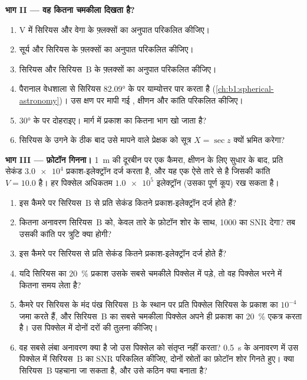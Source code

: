 \begin{problem}
\medskip
\noindent\textbf{भाग II --- वह कितना चमकीला दिखता है?}
\begin{enumerate}[resume]
  \item V में सिरियस और वेगा के फ़्लक्सों का अनुपात परिकलित कीजिए।
  \item सूर्य और सिरियस के फ़्लक्सों का अनुपात परिकलित कीजिए।
  \item सिरियस और सिरियस~B के फ़्लक्सों का अनुपात परिकलित कीजिए।
  \item पैरानाल वेधशाला से सिरियस \ang{82.09} के  पर याम्योत्तर पार करता है (\cref{ch:b1:spherical-astronomy})। उस क्षण पर मापी गई , क्षीणन और कांति परिकलित कीजिए।
  \item \ang{30} के  पर दोहराइए। मार्ग में प्रकाश का कितना भाग खो जाता है?
  \item सिरियस के उगने के ठीक बाद उसे मापने वाले प्रेक्षक को सूत्र $X = \sec z$ क्यों भ्रमित करेगा?
\end{enumerate}

\medskip
\noindent\textbf{भाग III --- फ़ोटॉन गिनना।}
\qty{1}{m} की दूरबीन पर एक कैमरा, क्षीणन के लिए सुधार के बाद, प्रति सेकंड $\num{3.0e4}$ प्रकाश-इलेक्ट्रॉन
दर्ज करता है, और यह एक ऐसे तारे से है जिसकी कांति $V = 10.0$ है। हर पिक्सेल अधिकतम
$\num{1.0e5}$ इलेक्ट्रॉन (उसका पूर्ण कूप) रख सकता है।
\begin{enumerate}[resume]
  \item इस कैमरे पर सिरियस~B से प्रति सेकंड कितने प्रकाश-इलेक्ट्रॉन दर्ज होते हैं?
  \item कितना अनावरण सिरियस~B को, केवल तारे के फ़ोटॉन शोर के साथ, 1000 का SNR देगा? तब उसकी कांति पर त्रुटि क्या होगी?
  \item इस कैमरे पर सिरियस से प्रति सेकंड कितने प्रकाश-इलेक्ट्रॉन दर्ज होते हैं?
  \item यदि सिरियस का \qty{20}{\percent} प्रकाश उसके सबसे चमकीले पिक्सेल में पड़े, तो वह पिक्सेल भरने में कितना समय लेता है?
  \item कैमरे पर सिरियस के मंद पंख सिरियस~B के स्थान पर प्रति पिक्सेल सिरियस के प्रकाश का $10^{-4}$ जमा करते हैं, और सिरियस~B का सबसे चमकीला पिक्सेल अपने ही प्रकाश का \qty{20}{\percent} एकत्र करता है। उस पिक्सेल में दोनों दरों की तुलना कीजिए।
  \item वह सबसे लंबा अनावरण क्या है जो उस पिक्सेल को संतृप्त नहीं करता? \qty{0.5}{s} के अनावरण में उस पिक्सेल में सिरियस~B का SNR परिकलित कीजिए, दोनों स्रोतों का फ़ोटॉन शोर गिनते हुए। क्या सिरियस~B पहचाना जा सकता है, और उसे कठिन क्या बनाता है?
\end{enumerate}


\end{problem}
